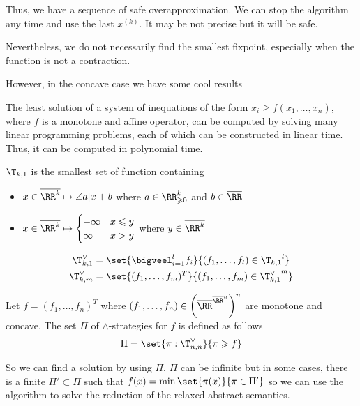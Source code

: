 \documentclass[a4paper, twoside, 10pt]{article}
\begin{document}
Thus, we have a sequence of safe overapproximation. We can stop the algorithm any time and use the last $x^{(k)}$. It may be not precise but it will be safe.

Nevertheless, we do not necessarily find the smallest fixpoint, especially when the function is not a contraction.

However, in the concave case we have some cool results

\begin{theorem}
    The least solution of a system of inequations of the form $x_i \geqslant f(x_1, \ldots, x_n)$, where $f$ is a monotone and affine operator, can be computed by solving many linear programming problems, each of which can be constructed in linear time. Thus, it can be computed in polynomial time.
\end{theorem}

\begin{notation}
    $\T_{k,1}$ is the smallest set of function containing
    \begin{itemize}
        \item $x\in\overline{\RR^k} \mapsto \angle{a\vert x} + b$ where $a\in\RR^k_{\geqslant 0}$ and $b \in \overline{\RR}$
        \item $x\in\overline{\RR^k} \mapsto \begin{cases}
            -\infty & x\leqslant y\\
            \infty & x > y
        \end{cases}$ where $y\in\overline{\RR^k}$
    \end{itemize}
\end{notation}

\begin{notation}
    \[
        \begin{aligned}
            \T_{k,1}^\vee &= \set{\bigveel_{i=1}^lf_i}{(f_1,\ldots,f_l)\in{\T_{k,1}}^l}\\
            \T_{k,m}^\vee &= \set{(f_1,\ldots,f_m)^T}{(f_1,\ldots,f_m)\in{\T_{k,1}^\vee}^m}
        \end{aligned}
    \]
\end{notation}

Let $f = (f_1,\ldots,f_n)^T$ where $(f_1,\ldots,f_n) \in \left(\overline{\RR}^{\overline{\RR}^n}\right)^n$ are monotone and concave. The set $\Pi$ of $\wedge$-strategies for $f$ is defined as follows
\[
    \Pi = \set{\pi:\T_{n,n}^\vee}{\pi \geqslant f}
\]

So we can find a solution by using $\Pi$. $\Pi$ can be infinite but in some cases, there is a finite $\Pi' \subset \Pi$ such that $f(x) = \min\set{\pi(x)}{\pi\in\Pi'}$ so we can use the algorithm to solve the reduction of the relaxed abstract semantics.
\end{document}
